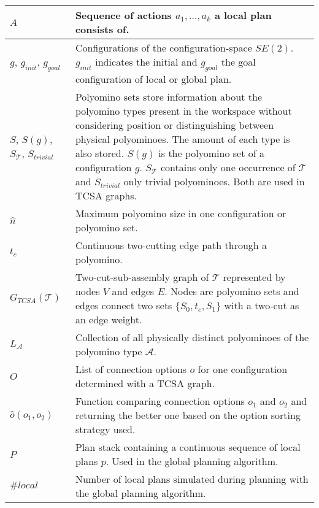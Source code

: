 \begin{xltabular}{\textwidth}{ l  X }
	$A$
	&
	Sequence of actions $a_1, ... , a_k$ a local plan consists of.
	\\ \midrule
		
	$g$, $g_\textit{init}$, $g_\textit{goal}$
	&
	Configurations of the configuration-space $\textit{SE}(2)$. $g_\textit{init}$ indicates the initial and $g_\textit{goal}$ the goal configuration of local or global plan.
	\\ \midrule
	
	$S$, $S(g)$, $S_\mathcal{T}$, $S_\textit{trivial}$
	&
	Polyomino sets store information about the polyomino types present in the workspace without considering position or distinguishing between physical polyominoes.
	The amount of each type is also stored.
	$S(g)$ is the polyomino set of a configuration $g$.
	$S_\mathcal{T}$ contains only one occurrence of $\mathcal{T}$ and $S_\textit{trivial}$ only trivial polyominoes.
	Both are used in TCSA graphs.
	\\ \midrule
	
	$\hat{n}$
	&
	Maximum polyomino size in one configuration or polyomino set.
	\\ \midrule
	
	$t_c$
	&
	Continuous two-cutting edge path through a polyomino.
	\\ \midrule
	
	$G_{\textit{TCSA}}(\mathcal{T})$
	&
	Two-cut-sub-assembly graph of $\mathcal{T}$ represented by nodes $V$ and edges $E$.
	Nodes are polyomino sets and edges connect two sets $\{S_0, t_c, S_1\}$ with a two-cut as an edge weight.
	\\ \midrule
	
	$L_\mathcal{A}$
	&
	Collection of all physically distinct polyominoes of the polyomino type $\mathcal{A}$.
	\\ \midrule
	
	$O$
	&
	List of connection options $o$ for one configuration determined with a TCSA graph.
	\\ \midrule
	
	$\hat{o}(o_1,o_2)$
	&
	Function comparing connection options $o_1$ and $o_2$ and returning the better one based on the option sorting strategy used.
	\\ \midrule
	
	$P$
	&
	Plan stack containing a continuous sequence of local plans $p$.
	Used in the global planning algorithm.
	\\ \midrule
	
	$\#\textit{local}$
	&
	Number of local plans simulated during planning with the global planning algorithm.
	\\ \midrule
	

\end{xltabular}
